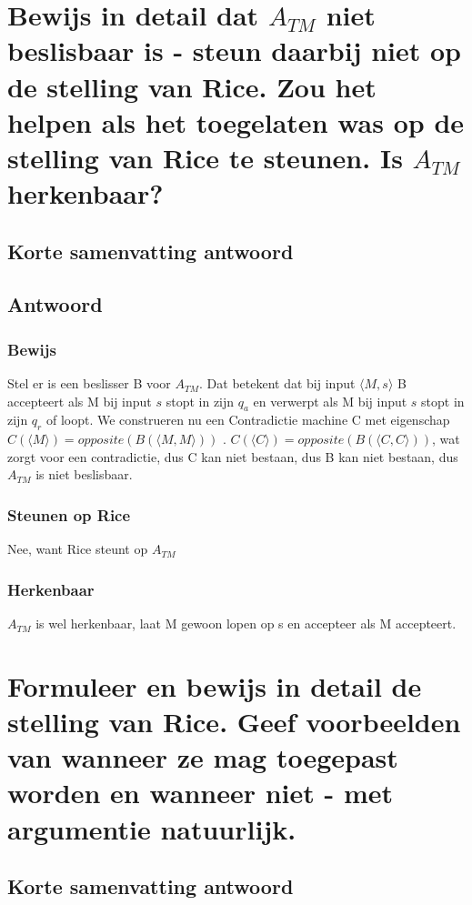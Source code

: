 \documentclass{article}
\begin{document}
\newpage
\section{Bewijs in detail dat $A_{TM}$ niet beslisbaar is - steun daarbij niet op de stelling van Rice. Zou het helpen als het toegelaten was op de stelling van Rice te steunen. Is $A_{TM}$ herkenbaar?}
    \subsection{Korte samenvatting antwoord}

    \subsection{Antwoord}
        \subsubsection{Bewijs}
            Stel er is een beslisser B voor $A_{TM}$. Dat betekent dat bij input $\langle M,s \rangle$ B accepteert als M bij input $s$ stopt in zijn $q_a$ en verwerpt als M bij input $s$ stopt in zijn $q_r$ of loopt.
            We construeren nu een Contradictie machine C met eigenschap $C(\langle M \rangle) = opposite(B(\langle M,M \rangle ))$ .
            $C(\langle C \rangle) = opposite(B(\langle C,C \rangle ))$, wat zorgt voor een contradictie, dus C kan niet bestaan, dus B kan niet bestaan, dus $A_{TM}$ is niet beslisbaar.

        \subsubsection{Steunen op Rice}
            Nee, want Rice steunt op $A_{TM}$
        \subsubsection{Herkenbaar}
            $A_{TM}$ is wel herkenbaar, laat M gewoon lopen op s en accepteer als M accepteert.

\newpage
\section{Formuleer en bewijs in detail de stelling van Rice. Geef voorbeelden van wanneer ze mag toegepast worden en wanneer niet - met argumentie natuurlijk.}
    \subsection{Korte samenvatting antwoord}
        
\end{document}
